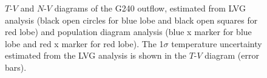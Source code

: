 \begin{figure}[htbp]
\centering
{}
\caption{$T$-$V$ and $N$-$V$ diagrams of the G240 outflow, estimated from LVG analysis (black open circles for blue lobe and black open squares for red lobe) and population diagram analysis (blue x marker for blue lobe and red x marker for red lobe). The 1$\sigma$ temperature uncertainty estimated from the LVG analysis is shown in the $T$-$V$ diagram (error bars). \label{fig5}}
\end{figure}


